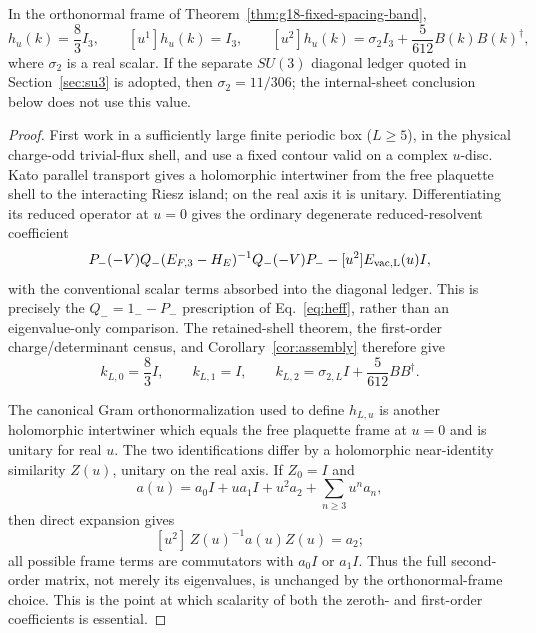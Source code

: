 \begin{lemma}
\label{lem:g18-finite-infinite-u2}
In the orthonormal frame of
Theorem~\ref{thm:g18-fixed-spacing-band},
\begin{equation}
 [u^0]h_u(k)=\frac83I_3,\qquad
 [u^1]h_u(k)=I_3,\qquad
 [u^2]h_u(k)=\sigma_2I_3+\frac5{612}B(k)B(k)^\dagger,
 \label{eq:g18-exact-infinite-u2}
\end{equation}
where $\sigma_2$ is a real scalar.  If the separate $SU(3)$ diagonal ledger
quoted in Section~\ref{sec:su3} is adopted, then $\sigma_2=11/306$; the
internal-sheet conclusion below does not use this value.
\end{lemma}

\begin{proof}
First work in a sufficiently large finite periodic box ($L\ge5$), in the
physical charge-odd trivial-flux shell, and use a fixed contour valid on a
complex $u$-disc.  Kato parallel transport gives a holomorphic intertwiner
from the free plaquette shell to the interacting Riesz island; on the real
axis it is unitary.  Differentiating its reduced operator at $u=0$ gives the ordinary
degenerate reduced-resolvent coefficient
\[
 P_-(-V)Q_-(E_{F,3}-H_E)^{-1}Q_-(-V)P_-
   -[u^2]E_{\rm vac,L}(u)I,
\]
with the conventional scalar terms absorbed into the diagonal ledger.  This
is precisely the $Q_-=1_--P_-$ prescription of Eq.~\eqref{eq:heff}, rather
than an eigenvalue-only comparison.  The retained-shell theorem,
the first-order charge/determinant census, and
Corollary~\ref{cor:assembly} therefore give
\[
 k_{L,0}=\frac83I,\qquad k_{L,1}=I,\qquad
 k_{L,2}=\sigma_{2,L}I+\frac5{612}BB^\dagger.
 \label{eq:g18-finite-kato-u2}
\]

The canonical Gram orthonormalization used to define $h_{L,u}$ is another
holomorphic intertwiner which equals the free plaquette frame at $u=0$ and
is unitary for real $u$.  The two identifications differ by a holomorphic
near-identity similarity $Z(u)$, unitary on the real axis.  If
$Z_0=I$ and
\[
 a(u)=a_0I+ua_1I+u^2a_2+\sum_{n\ge3}u^na_n,
\]
then direct expansion gives
\[
 [u^2]\,Z(u)^{-1}a(u)Z(u)=a_2;
\]
all possible frame terms are commutators with $a_0I$ or $a_1I$.  Thus the
full second-order matrix, not merely its eigenvalues, is unchanged by the
orthonormal-frame choice.  This is the point at which scalarity of both the
zeroth- and first-order coefficients is essential.


\end{proof}
